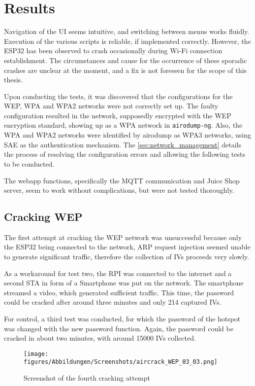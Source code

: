 \section{Results}\label{sec:results}
Navigation of the UI seems intuitive, and switching between menus works fluidly.
Execution of the various scripts is reliable, if implemented correctly.
However, the ESP32 has been observed to crash occasionally during Wi-Fi connection establishment.
The circumstances and cause for the occurrence of these sporadic crashes are unclear at the moment, and a fix is not foreseen for the scope of this thesis.

Upon conducting the tests, it was discovered that the configurations for the WEP, WPA and WPA2 networks were not correctly set up.
The faulty configuration resulted in the network, supposedly encrypted with the WEP encryption standard, showing up as a WPA network in \lstinline[]|airodump-ng|.
Also, the WPA and WPA2 networks were identified by airodump as WPA3 networks, using SAE as the authentication mechanism.
The \cref{sec:network_management} details the process of resolving the configuration errors and allowing the following tests to be conducted.

The webapp functions, specifically the MQTT communication and Juice Shop server, seem to work without complications, but were not tested thoroughly.

\subsection{Cracking WEP}
The first attempt at cracking the WEP network was unsuccessful because only the ESP32 being connected to the network, ARP request injection seemed unable to generate significant traffic, therefore the collection of IVs proceeds very slowly.

As a workaround for test two, the RPI was connected to the internet and a second STA in form of a Smartphone was put on the network.
The smartphone streamed a video, which generated sufficient traffic.
This time, the password could be cracked after around three minutes and only 214 captured IVs.

For control, a third test was conducted, for which the password of the hotspot was changed with the new password function.
Again, the password could be cracked in about two minutes, with around 15000 IVs collected.

\begin{figure}[h]
    \centering
    \texttt{[image: figures/Abbildungen/Screenshots/aircrack\_WEP\_03\_03.png]}
    \caption{Screenshot of the fourth cracking attempt}
    \label{fig:aircrack-ng_WEP_success}
\end{figure}

